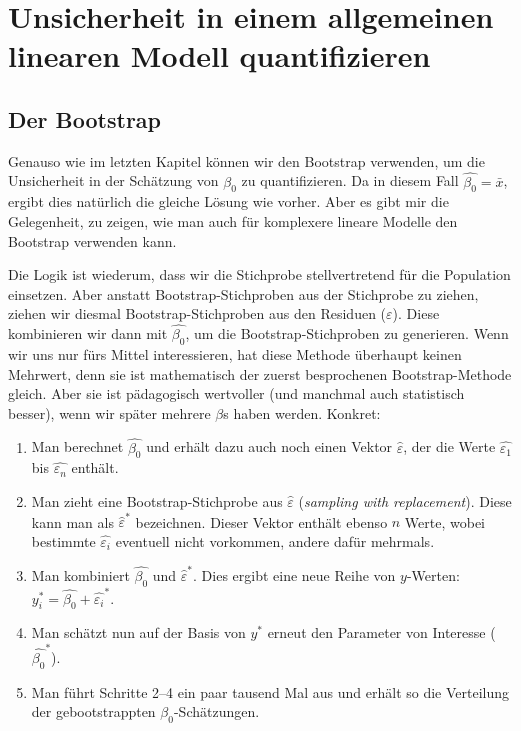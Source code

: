 \documentclass[oneside, 10pt]{book}\usepackage[]{graphicx}\usepackage[]{xcolor}
\begin{document}
\section{Unsicherheit in einem allgemeinen linearen Modell quantifizieren}

\subsection{Der Bootstrap}
Genauso wie im letzten Kapitel können wir den Bootstrap
verwenden, um die Unsicherheit in der Schätzung von $\beta_0$
zu quantifizieren. Da in diesem Fall $\widehat{\beta_0} = \bar{x}$,
ergibt dies natürlich die gleiche Lösung wie vorher. Aber es gibt
mir die Gelegenheit, zu zeigen, wie man auch für komplexere
lineare Modelle den Bootstrap verwenden kann.

Die Logik ist wiederum, dass wir die Stichprobe stellvertretend
für die Population einsetzen. Aber anstatt Bootstrap-Stichproben
aus der Stichprobe zu ziehen, ziehen wir diesmal Bootstrap-Stichproben
aus den Residuen ($\varepsilon$). Diese kombinieren wir dann
mit $\widehat{\beta_0}$, um die Bootstrap-Stichproben zu generieren.
Wenn wir uns nur fürs Mittel interessieren, hat diese Methode
überhaupt keinen Mehrwert, denn sie ist mathematisch der zuerst
besprochenen Bootstrap-Methode gleich. Aber sie ist pädagogisch wertvoller
(und manchmal auch statistisch besser),
wenn wir später mehrere $\beta$s haben werden.
Konkret:
\begin{enumerate}\label{bootstrapoverview}
 \item Man berechnet $\widehat{\beta_0}$ und erhält dazu auch noch
 einen Vektor $\hat{\varepsilon}$, der die Werte
 $\widehat{\varepsilon_1}$ bis $\widehat{\varepsilon_n}$ enthält.
 \item Man zieht eine Bootstrap-Stichprobe aus $\hat{\varepsilon}$ (\textit{sampling with replacement}).
 Diese kann man als $\hat{\varepsilon}^{*}$ bezeichnen.
 Dieser Vektor enthält ebenso $n$ Werte,
 wobei bestimmte $\widehat{\varepsilon_i}$ eventuell 
 nicht vorkommen, andere dafür mehrmals.
 \item Man kombiniert $\widehat{\beta_0}$ und $\hat{\varepsilon}^{*}$. Dies ergibt
 eine neue Reihe von $y$-Werten: $y_i^{*} = \widehat{\beta_0} + \widehat{\varepsilon_i}^{*}$.
 \item Man schätzt nun auf der Basis von $y^{*}$ erneut den Parameter von Interesse ($\widehat{\beta_0}^{*}$).
 \item Man führt Schritte 2--4 ein paar tausend Mal aus und erhält so die Verteilung
 der gebootstrappten $\beta_0$-Schätzungen.
\end{enumerate}
\end{document}
